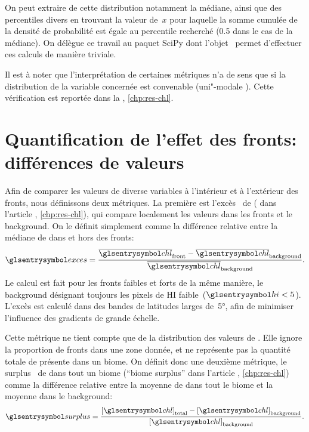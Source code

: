 On peut extraire de cette distribution notamment la médiane, ainsi que des percentiles divers en trouvant la valeur de~\(x\) pour laquelle la somme cumulée de la densité de probabilité est égale au percentile recherché (0.5 dans le cas de la médiane).
On délègue ce travail au paquet SciPy dont l'objet~ permet d'effectuer ces calculs de manière triviale.

Il est à noter que l'interprétation de certaines métriques n'a de sens que si la distribution de la variable concernée est convenable (uni"-modale ).
Cette vérification est reportée dans la , \cref*{chp:res-chl}.

\section{Quantification de l'effet des fronts: différences de valeurs}
\label{sec:extraction-surplus-lag}

Afin de comparer les valeurs de diverse variables à l'intérieur et à l'extérieur des fronts, nous définissons deux métriques.
La première est l'excès~ de  ( dans l'article , \cref*{chp:res-chl}), qui compare localement les valeurs dans les fronts et le background. On le définit simplement comme la différence relative entre la médiane de  dans et hors des fronts:
\begin{equation}
  \am{exces} = \frac{\med{\am{chl}}_\frt - \med{\am{chl}}_\bkg}
  {\med{\am{chl}}_\bkg} .
\end{equation}
Le calcul est fait pour les fronts faibles et forts de la même manière, le background désignant toujours les pixels de HI faible~(\(\am{hi} < 5\)).
L'excès est calculé dans des bandes de latitudes larges de~\ang[mode=math]{5}, afin de minimiser l'influence des gradients de grande échelle.

Cette métrique ne tient compte que de la distribution des valeurs de . Elle ignore la proportion de fronts dans une zone donnée, et ne représente pas la quantité totale de  présente dans un biome.
On définit donc une deuxième métrique, le surplus~ de  dans tout un biome (\enquote{biome surplus} dans l'article , \cref*{chp:res-chl}) comme la différence relative entre la moyenne de  dans tout le biome et la moyenne dans le background:
\begin{equation}
  \am{surplus} = \frac{\moy{\am{chl}}_\tot - \moy{\am{chl}}_\bkg}
  {\moy{\am{chl}}_\bkg} .
\end{equation}

